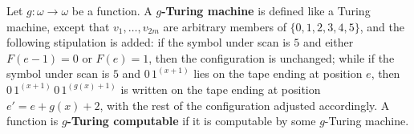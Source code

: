 Let $g : \omega \to \omega$ be a function. A \textbf{$g$-Turing machine} is defined like a Turing machine, except that $v_1, \ldots, v_{2m}$ are arbitrary members of $\{0, 1, 2, 3, 4, 5\}$, and the following stipulation is added: if the symbol under scan is $5$ and either $F(e-1) = 0$ or $F(e) = 1$, then the configuration is unchanged; while if the symbol under scan is $5$ and $0\,1^{(x+1)}$ lies on the tape ending at position $e$, then $0\,1^{(x+1)}\,0\,1^{(g(x)+1)}$ is written on the tape ending at position $e' = e + g(x) + 2$, with the rest of the configuration adjusted accordingly. A function is \textbf{$g$-Turing computable} if it is computable by some $g$-Turing machine.
